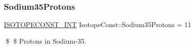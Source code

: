 \subsubsection{\texorpdfstring{Sodium35\+Protons}{Sodium35Protons}}
{\footnotesize\ttfamily \mbox{\hyperlink{group___isotope_const-_macros_ga5f18360b3e99483a35c32d789e62621c}{I\+S\+O\+T\+O\+P\+E\+C\+O\+N\+S\+T\+\_\+\+I\+NT}} Isotope\+Const\+::\+Sodium35\+Protons = 11}

\$ \$ Protons in Sodium-\/35. 